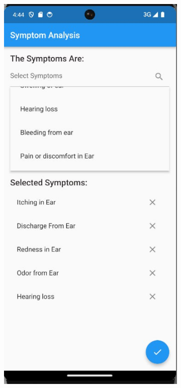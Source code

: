 \begin{figure}[ht]
\begin{subfigure}{0.43\textwidth}
    \includegraphics[width=\linewidth]{img/disease2.jpg}
    

\end{subfigure}
\end{figure}
